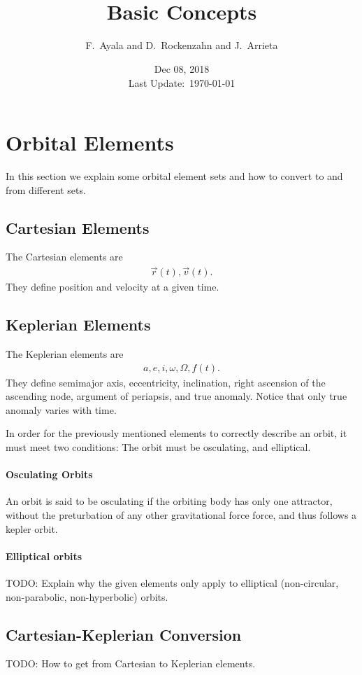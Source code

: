 \documentclass[fleqn]{article}
\title{\mxd\\Basic Concepts}
\author{F.~Ayala and D.~Rockenzahn and J.~Arrieta}
\date{Dec 08, 2018\\\small{Last Update:~\today}}
\begin{document}
\maketitle


\section{Orbital Elements}
In this section we explain some orbital element sets and how to convert to and
from different sets.
\subsection{Cartesian Elements}
The Cartesian elements are
\begin{align}
  \vec{r}(t), \vec{v}(t).
\end{align}
They define position and velocity at a given time.

\subsection{Keplerian Elements}
The Keplerian elements are
\begin{align}
  a, e, i, \omega, \Omega, f(t).
\end{align}
They define semimajor axis, eccentricity, inclination, right ascension of the
ascending node, argument of periapsis, and true anomaly. Notice that only true
anomaly varies with time.

In order for the previously mentioned elements to correctly describe an orbit, it must meet two conditions: The orbit must be osculating, and elliptical.

\paragraph{Osculating Orbits}
An orbit is said to be osculating if the orbiting body has only one attractor, without the preturbation of any other gravitational force force, and thus follows a kepler orbit.

\paragraph{Elliptical orbits}  
TODO: Explain why the given elements only apply to elliptical (non-circular,
non-parabolic, non-hyperbolic) orbits.

\subsection{Cartesian-Keplerian Conversion}
TODO: How to get from Cartesian to Keplerian elements.
\end{document}
